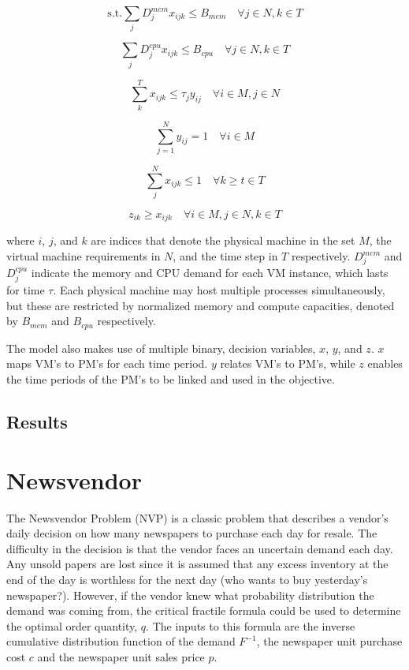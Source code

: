 \documentclass[12pt]{article}
\begin{document}
\begin{equation}
    \textrm{s.t.} \sum_j D_j^{mem} x_{ijk} \leq B_{mem} \quad \forall j \in N, k \in T
\end{equation}

\begin{equation}
    \sum_j D_j^{cpu} x_{ijk}  \leq B_{cpu} \quad \forall j \in N, k \in T
\end{equation}

\begin{equation}
    \sum_k^T x_{ijk} \leq \tau_j y_{ij} \quad \forall i \in M, j \in N
\end{equation}

\begin{equation}
    \sum_{j=1}^N y_{ij} = 1 \quad \forall i \in M
\end{equation}

\begin{equation}
    \sum_j^N x_{ijk} \leq 1 \quad \forall k \geq t \in T 
\end{equation}

\begin{equation}
    z_{ik} \geq x_{ijk} \quad \forall i \in M, j \in N, k \in T
\end{equation}

where $i$, $j$, and $k$ are indices that denote the physical machine in the set $M$, the virtual machine requirements in $N$, and the time step in $T$ respectively. $D_j^{mem}$ and $D_j^{cpu}$ indicate the memory and CPU demand for each VM instance, which lasts for time $\tau$. Each physical machine may host multiple processes simultaneously, but these are restricted by normalized memory and compute capacities, denoted by $B_{mem}$ and $B_{cpu}$ respectively. 

The model also makes use of multiple binary, decision variables, $x$, $y$, and $z$. $x$ maps VM's to PM's for each time period. $y$ relates VM's to PM's, while $z$ enables the time periods of the PM's to be linked and used in the objective.

\subsection{Results}

\section{Newsvendor}

The Newsvendor Problem (NVP) is a classic problem that describes a vendor's daily decision on how many newspapers to purchase each day for resale. The difficulty in the decision is that the vendor faces an uncertain demand each day. Any unsold papers are lost since it is assumed that any excess inventory at the end of the day is worthless for the next day (who wants to buy yesterday's newspaper?). However, if the vendor knew what probability distribution the demand was coming from, the critical fractile formula could be used to determine the optimal order quantity, $q$. The inputs to this formula are the inverse cumulative distribution function of the demand $F^{-1}$, the newspaper unit purchase cost $c$ and the newspaper unit sales price $p$.
\end{document}
